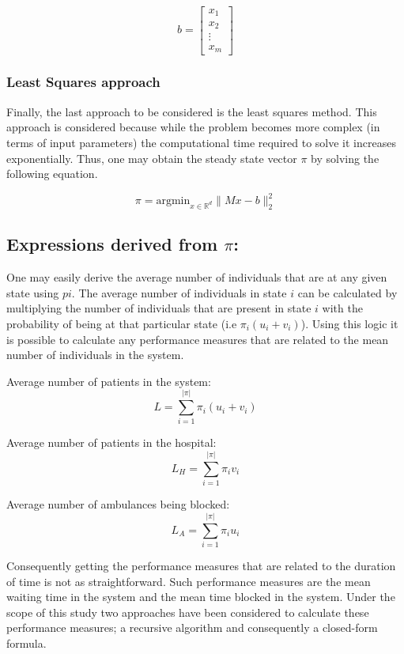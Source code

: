 \[
b = 
\begin{bmatrix}
    x_{1} \\
    x_{2} \\
    \vdots \\
    x_{m}
\end{bmatrix}
\]


\subsubsection{Least Squares approach}
Finally, the last approach to be considered is the least squares method. This approach is considered because while the problem becomes more complex (in terms of input parameters) the computational time required to solve it increases exponentially. Thus, one may obtain the steady state vector \( \pi \) by solving the following equation.

\[
\pi = \text{argmin}_{x\in\mathbb{R}^{d}}\|Mx-b\|_2^2
\]

\newpage
\subsection{Expressions derived from \( \pi \):}
One may easily derive the average number of individuals that are at any given state using \( pi \). The average number of individuals in state \( i \) can be calculated by multiplying the number of individuals that are present in state \( i \) with the probability of being at that particular state (i.e \(\pi_i (u_i + v_i)\)). Using this logic it is possible to calculate any performance measures that are related to the mean number of individuals in the system.


Average number of patients in the system: 
\begin{equation}
    L = \sum_{i=1}^{|\pi|} \pi_i (u_i + v_i)
\end{equation} 

Average number of patients in the hospital: 
\begin{equation}
    L_H = \sum_{i=1}^{|\pi|} \pi_i v_i
\end{equation}

Average number of ambulances being blocked:
\begin{equation}
    L_A = \sum_{i=1}^{|\pi|} \pi_i u_i
\end{equation}

Consequently getting the performance measures that are related to the duration of time is not as straightforward. Such performance measures are the mean waiting time in the system and the mean time blocked in the system. Under the scope of this study two approaches have been considered to calculate these performance measures; a recursive algorithm and consequently a closed-form formula.

